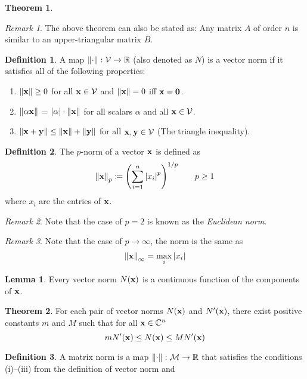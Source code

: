 \documentclass[11pt,letterpaper]{article}
\numberwithin{figure}{section} %
\newcommand{\Reals}{\mathbb{R}}
\newcommand{\Complex}{\mathbb{C}}
\newcommand{\keyword}[1]{\colorbox{cyan!20!}{#1}}
\theoremstyle{definition}
\newtheorem{theorem}{Theorem}[subsection]
\theoremstyle{definition}
\newtheorem{lemma}{Lemma}[subsection]
\theoremstyle{definition}
\newtheorem{definition}{Definition}[subsection]
\theoremstyle{definition}
\theoremstyle{remark}
\newtheorem*{remark}{Remark}
\theoremstyle{remark}
\theoremstyle{definition}
\theoremstyle{remark}
\theoremstyle{remark}
\begin{document}
\begin{multicols*}{3}
\begin{theorem}
\end{theorem}
\begin{remark}
	The above theorem can also be stated as: Any matrix $A$ of order $n$ is
	similar to an upper-triangular matrix $B$.
\end{remark}
\begin{definition}
	A map $\norm{\cdot} : \mathcal{V} \to \Reals$ (also denoted as $N$) is a
	\keyword{vector norm} if it satisfies all of the following properties:
	\begin{enumerate}[label={(\roman*)}]
		\item $\norm{\vb{x}} \geq 0$ for all $\vb{x} \in \mathcal{V}$ and
			$\norm{\vb{x}} = 0$ iff $\vb{x} = \vb{0}$.
		\item $\norm{\alpha \vb{x}}$ = $\abs{\alpha}\cdot \norm{\vb{x}}$ for all 
			scalars $\alpha$ and all $\vb{x} \in \mathcal{V}$.
		\item $\norm{\vb{x} + \vb{y}} \leq \norm{\vb{x}} + \norm{\vb{y}}$ for all
			$\vb{x},\vb{y} \in \mathcal{V}$ (The triangle inequality).
	\end{enumerate}
\end{definition}
\begin{definition}
	The \keyword{$p$-norm} of a vector $\vb{x}$ is defined as 
	\[
		\norm{\vb{x}}_p \coloneqq \pqty{\sum_{i=1}^n \abs{x_i}^p}^{1/p} \qquad p \geq 1
	\]
	where $x_i$ are the entries of $\vb{x}$.
\end{definition}
\begin{remark}
	Note that the case of $p=2$ is known as the \textit{Euclidean norm}.
\end{remark}
\begin{remark}
	Note that the case of $p\to\infty$, the norm is the same as
	\[
		\norm{\vb{x}}_\infty = \max_i \abs{x_i}
	\]
\end{remark}
\begin{lemma}\label{lem:norm_cont_func}
	Every vector norm $N(\vb{x})$ is a continuous function of the components of
	$\vb{x}$.
\end{lemma}
\begin{theorem}\label{thm:norm_eqiv}
	For each pair of vector norms $N(\vb{x})$ and $N'(\vb{x})$, there exist
	positive constants $m$ and $M$ such that for all $\vb{x} \in \Complex^n$
	\[
		mN'(\vb{x}) \leq N(\vb{x}) \leq MN'(\vb{x})
	\]
\end{theorem}
\begin{definition}
	A \keyword{matrix norm} is a map $\norm{\cdot} : \mathcal{M} \to \Reals$ that
	satisfies the conditions (i)--(iii) from the definition of vector norm and

\end{definition}
\end{multicols*}
\end{document}
